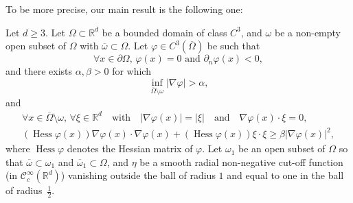 \documentclass[AHL,Unicode,longabstracts]{cedram}
\newcommand{\scC}{\mathscr{C}}
\newcommand*\R{\mathbb{R}}
\renewcommand{\geq}{\geqslant}
\DeclareMathOperator{\Hess}{Hess}
\let\oldforall\forall
\renewcommand*{\forall}{\mathrel{\oldforall}}
\begin{document}
To be more precise, our main result is the following one:
\begin{theo}\label{Thm-Carleman-General}
Let $d\geqslant 3$. Let $\Omega \subset \R^{d}$ be a bounded domain of class $C^3$, and $\omega$ be a non-empty open subset of $\Omega$ with $\overline \omega \subset \Omega$. Let $\varphi \in C^3(\overline{\Omega})$ be such that
\begin{equation}\label{CarlemanWeight-Cond0}
\forall x \in \partial \Omega, \, \varphi(x) = 0 \text{ and }
\partial_n \varphi(x) < 0,
\end{equation}
and there exists $\alpha, \beta > 0$ for which
\begin{equation}\label{CarlemanWeight-Cond1}
\inf_{\overline{\Omega}\setminus \omega} \vert \nabla \varphi \vert > \alpha,
\end{equation}
and
\begin{multline}\label{CarlemanWeight-Cond2}
\forall x \in \overline{\Omega} \setminus \omega, \, \forall \xi \in \R^d \quad\text{with}\quad \vert \nabla \varphi(x) \vert = \vert \xi \vert \quad\text{and}\quad \nabla \varphi(x) \cdot \xi = 0,
\\
(\Hess \varphi(x)) \nabla \varphi(x) \cdot \nabla \varphi(x) + (\Hess \varphi(x)) \xi \cdot \xi \geq \beta \vert \nabla \varphi(x) \vert^2,
\end{multline}
where $\Hess \varphi$ denotes the Hessian matrix of $\varphi$. Let $\omega_1$ be an open subset of $\Omega$ so that $\overline \omega \subset \omega_1$ and $\overline\omega_1 \subset \Omega$, and $\eta$ be a smooth radial non-negative cut-off function (in $\scC^\infty_c(\R^d)$) vanishing outside the ball of radius $1$ and equal to one in the ball of radius~$\frac{1}{2}$.


\end{theo}
\end{document}
